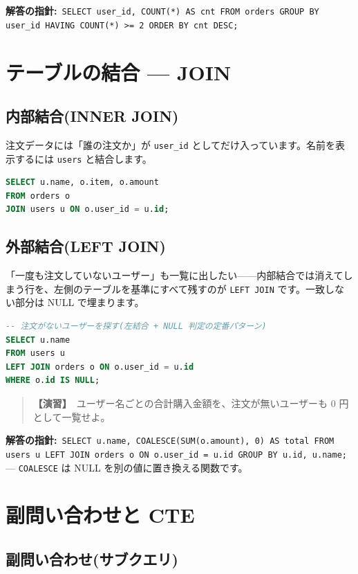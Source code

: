\documentclass{article}
\begin{document}
\textbf{解答の指針:}\ \texttt{SELECT user\_id, COUNT(*) AS cnt FROM orders GROUP BY user\_id HAVING COUNT(*) >= 2 ORDER BY cnt DESC;}

\section{テーブルの結合 — JOIN}

\subsection{内部結合(INNER JOIN)}

注文データには「誰の注文か」が \texttt{user\_id} としてだけ入っています。名前を表示するには \texttt{users} と結合します。

\begin{lstlisting}[language=SQL]
SELECT u.name, o.item, o.amount
FROM orders o
JOIN users u ON o.user_id = u.id;
\end{lstlisting}

\subsection{外部結合(LEFT JOIN)}

「一度も注文していないユーザー」も一覧に出したい——内部結合では消えてしまう行を、左側のテーブルを基準にすべて残すのが \texttt{LEFT JOIN} です。一致しない部分は NULL で埋まります。

\begin{lstlisting}[language=SQL]
-- 注文がないユーザーを探す(左結合 + NULL 判定の定番パターン)
SELECT u.name
FROM users u
LEFT JOIN orders o ON o.user_id = u.id
WHERE o.id IS NULL;
\end{lstlisting}

\begin{quote}
\textbf{【演習】}\ ユーザー名ごとの合計購入金額を、注文が無いユーザーも 0 円として一覧せよ。
\end{quote}

\textbf{解答の指針:}\ \texttt{SELECT u.name, COALESCE(SUM(o.amount), 0) AS total FROM users u LEFT JOIN orders o ON o.user\_id = u.id GROUP BY u.id, u.name;} — \texttt{COALESCE} は NULL を別の値に置き換える関数です。

\section{副問い合わせと CTE}

\subsection{副問い合わせ(サブクエリ)}
\end{document}
